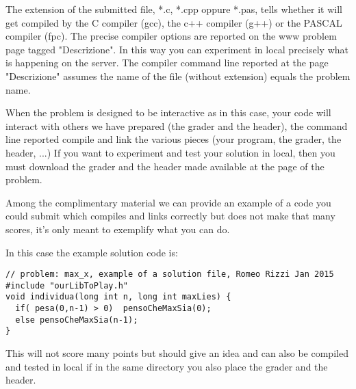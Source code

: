 \documentclass[a4paper,11pt]{article}
\begin{document}
  The extension of the submitted file, *.c, *.cpp oppure *.pas,
  tells whether it will get compiled by the C compiler (gcc),
  the c++ compiler (g++) or the PASCAL compiler (fpc).
  The precise compiler options are reported on the www problem page tagged "Descrizione".
  In this way you can experiment in local precisely what is happening on the server. 
  The compiler command line reported at the page "Descrizione" assumes the name of the file (without extension) equals the problem name.

  When the problem is designed to be interactive as in this case, your code will interact with others we have prepared (the grader and the header), the command line reported compile and link the various pieces (your program, the grader, the header, ...)
  If you want to experiment and test your solution in local,
  then you must download the grader and the header made available at the page of the problem.

  Among the complimentary material we can provide an example of a code you could submit which compiles and links correctly but does not make that many scores, it's only meant to exemplify what you can do.

  In this case the example solution code is:
\begin{verbatim}
// problem: max_x, example of a solution file, Romeo Rizzi Jan 2015
#include "ourLibToPlay.h"
void individua(long int n, long int maxLies) {
  if( pesa(0,n-1) > 0)  pensoCheMaxSia(0); 
  else pensoCheMaxSia(n-1); 
}
\end{verbatim}

This will not score many points but should give an idea and can also be compiled and tested in local if in the same directory you also place the grader and the header.

  
\end{document}
